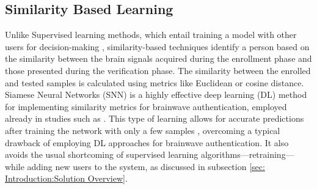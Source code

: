\subsection{Similarity Based Learning}
\label{sec:Framework:Classification:Similarity Based Learning}
Unlike Supervised learning methods, which entail training a model with other users for decision-making \cite{fallahi2023brainnet}, similarity-based techniques identify a person based on the similarity between the brain signals acquired during the enrollment phase and those presented during the verification phase. The similarity between the enrolled and tested samples is calculated using metrics like Euclidean or cosine distance. Siamese Neural Networks (SNN) is a highly effective deep learning (DL) method for implementing similarity metrics for brainwave authentication, employed already in studies such as \cite{fallahi2023brainnet, seha2020eeg, maiorana2019eeg}. This type of learning allows for accurate predictions after training the network with only a few samples \cite{facenet}, overcoming a typical drawback of employing DL approaches for brainwave authentication. It also avoids the usual shortcoming of supervised learning algorithms—retraining—while adding new users to the system, as discussed in subsection \ref{sec: Introduction:Solution Overview}. 
\smallskip

